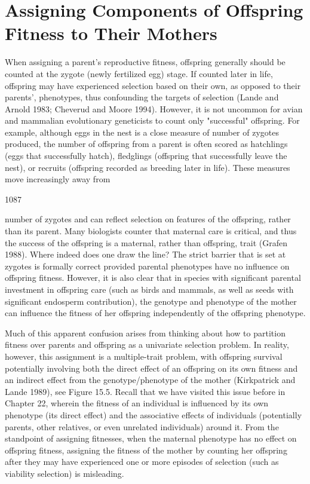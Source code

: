 \documentclass{article}
\begin{document}
\section{Assigning Components of Offspring Fitness to Their Mothers}
When assigning a parent's reproductive fitness, offspring generally should be counted at the zygote (newly fertilized egg) stage. If counted later in life, offspring may have experienced selection based on their own, as opposed to their parents', phenotypes, thus confounding the targets of selection (Lande and Arnold 1983; Cheverud and Moore 1994). However, it is not uncommon for avian and mammalian evolutionary geneticists to count only "successful" offspring. For example, although eggs in the nest is a close measure of number of zygotes produced, the number of offspring from a parent is often scored as hatchlings (eggs that successfully hatch), fledglings (offspring that successfully leave the nest), or recruits (offspring recorded as breeding later in life). These measures move increasingly away from

1087

number of zygotes and can reflect selection on features of the offspring, rather than its parent. Many biologists counter that maternal care is critical, and thus the success of the offspring is a maternal, rather than offspring, trait (Grafen 1988). Where indeed does one draw the line? The strict barrier that is set at zygotes is formally correct provided parental phenotypes have no influence on offspring fitness. However, it is also clear that in species with significant parental investment in offspring care (such as birds and mammals, as well as seeds with significant endosperm contribution), the genotype and phenotype of the mother can influence the fitness of her offspring independently of the offspring phenotype.

Much of this apparent confusion arises from thinking about how to partition fitness over parents and offspring as a univariate selection problem. In reality, however, this assignment is a multiple-trait problem, with offspring survival potentially involving both the direct effect of an offspring on its own fitness and an indirect effect from the genotype/phenotype of the mother (Kirkpatrick and Lande 1989), see Figure 15.5. Recall that we have visited this issue before in Chapter 22, wherein the fitness of an individual is influenced by its own phenotype (its direct effect) and the associative effects of individuals (potentially parents, other relatives, or even unrelated individuals) around it. From the standpoint of assigning fitnesses, when the maternal phenotype has no effect on offspring fitness, assigning the fitness of the mother by counting her offspring after they may have experienced one or more episodes of selection (such as viability selection) is misleading.
\end{document}
